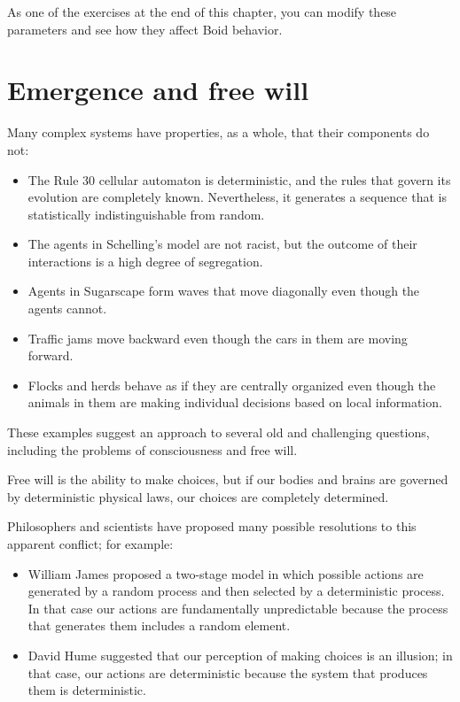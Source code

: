 \documentclass[12pt]{book}
\theoremstyle{exercise}
\begin{document}
As one of the exercises at the end of this chapter, you can modify these parameters and see how they affect Boid behavior.


\section{Emergence and free will}
\label{freewill}

Many complex systems have properties, as a whole, that their components do not:

\begin{itemize}

\item The Rule 30 cellular automaton is deterministic, and the rules
  that govern its evolution are completely known.  Nevertheless, it
  generates a sequence that is statistically indistinguishable from
  random.

\item The agents in Schelling's model are not racist, but the outcome
  of their interactions is a high degree of segregation.

\item Agents in Sugarscape form waves that move diagonally even
  though the agents cannot.

\item Traffic jams move backward even though the cars in them are
  moving forward.

\item Flocks and herds behave as if they are centrally organized even though the animals in them are making individual decisions based on local information.

\end{itemize}

These examples suggest an approach to several old and challenging questions, including the problems of consciousness and free will.


Free will is the ability to make choices, but if our bodies and brains
are governed by deterministic physical laws, our choices are completely determined.  

Philosophers and scientists have proposed many possible resolutions to this apparent conflict; for example:

\begin{itemize}

\item William James proposed a two-stage model in which
  possible actions are generated by a random process and then selected
  by a deterministic process.  In that case our actions are
  fundamentally unpredictable because the process that generates them
  includes a random element.

\item David Hume suggested that our perception of making choices
  is an illusion; in that case, our actions are deterministic because
  the system that produces them is deterministic.

\end{itemize}
\end{document}
